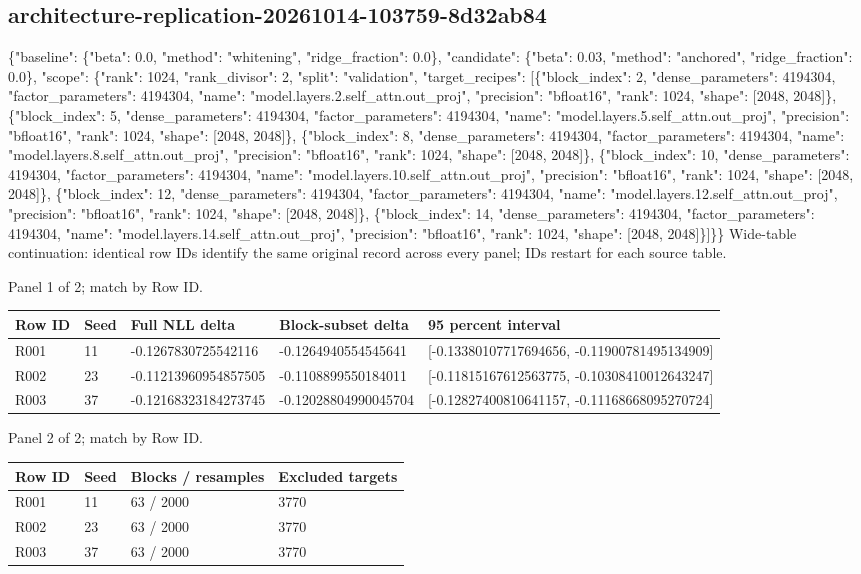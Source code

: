 \documentclass[10pt]{article}
\begin{document}
\subsection{architecture-replication-20261014-103759-8d32ab84}
\{"baseline": \{"beta": 0.0, "method": "whitening", "ridge\_fraction": 0.0\}, "candidate": \{"beta": 0.03, "method": "anchored", "ridge\_fraction": 0.0\}, "scope": \{"rank": 1024, "rank\_divisor": 2, "split": "validation", "target\_recipes": [\{"block\_index": 2, "dense\_parameters": 4194304, "factor\_parameters": 4194304, "name": "model.layers.2.self\_attn.out\_proj", "precision": "bfloat16", "rank": 1024, "shape": [2048, 2048]\}, \{"block\_index": 5, "dense\_parameters": 4194304, "factor\_parameters": 4194304, "name": "model.layers.5.self\_attn.out\_proj", "precision": "bfloat16", "rank": 1024, "shape": [2048, 2048]\}, \{"block\_index": 8, "dense\_parameters": 4194304, "factor\_parameters": 4194304, "name": "model.layers.8.self\_attn.out\_proj", "precision": "bfloat16", "rank": 1024, "shape": [2048, 2048]\}, \{"block\_index": 10, "dense\_parameters": 4194304, "factor\_parameters": 4194304, "name": "model.layers.10.self\_attn.out\_proj", "precision": "bfloat16", "rank": 1024, "shape": [2048, 2048]\}, \{"block\_index": 12, "dense\_parameters": 4194304, "factor\_parameters": 4194304, "name": "model.layers.12.self\_attn.out\_proj", "precision": "bfloat16", "rank": 1024, "shape": [2048, 2048]\}, \{"block\_index": 14, "dense\_parameters": 4194304, "factor\_parameters": 4194304, "name": "model.layers.14.self\_attn.out\_proj", "precision": "bfloat16", "rank": 1024, "shape": [2048, 2048]\}]\}\}
Wide-table continuation: identical row IDs identify the same original record across every panel; IDs restart for each source table.
\par\noindent Panel 1 of 2; match by Row ID.
{\scriptsize\setlength{\tabcolsep}{2pt}
\begin{longtable}{p{}p{}p{}p{}p{}}
Row ID & Seed & Full NLL delta & Block-subset delta & 95 percent interval \\
\hline\endhead
R001 & 11 & -0.1267830725542116 & -0.1264940554545641 & [-0.13380107717694656, -0.11900781495134909] \\
R002 & 23 & -0.11213960954857505 & -0.1108899550184011 & [-0.11815167612563775, -0.10308410012643247] \\
R003 & 37 & -0.12168323184273745 & -0.12028804990045704 & [-0.12827400810641157, -0.11168668095270724] \\
\end{longtable}}
\par\noindent Panel 2 of 2; match by Row ID.
{\scriptsize\setlength{\tabcolsep}{2pt}
\begin{longtable}{p{}p{}p{}p{}}
Row ID & Seed & Blocks / resamples & Excluded targets \\
\hline\endhead
R001 & 11 & 63 / 2000 & 3770 \\
R002 & 23 & 63 / 2000 & 3770 \\
R003 & 37 & 63 / 2000 & 3770 \\
\end{longtable}}
\end{document}
